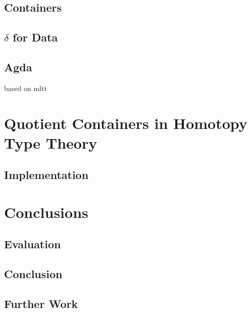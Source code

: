 \documentclass[12pt]{report}
\begin{document}
\chapter{Containers}


\chapter{$\delta$ for Data}

\chapter{Agda}
based on mltt







\part{Quotient Containers in Homotopy Type Theory}

\chapter{Implementation}

\part{Conclusions}

\chapter{Evaluation}

\chapter{Conclusion}

\chapter{Further Work}

\cleardoublepage
{}
{}
\end{document}
